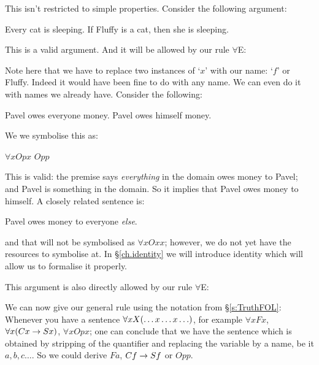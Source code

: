 This isn't restricted to simple properties. Consider the following argument:
\begin{earg}
\prem Every cat is sleeping.
\conc If Fluffy is a cat, then she is sleeping.
\end{earg}
This is a valid argument. And it will be allowed by our rule $\forall$E:
\begin{pf}
	 
\end{pf}
Note here that we have to replace two instances of `$x$' with our name: `$f$' or Fluffy. Indeed it would have been fine to do with any name. We can even do it with names we already have. Consider the following:
\begin{earg}
\prem Pavel owes everyone money.
\conc Pavel owes himself money.
\end{earg}
We we symbolise this as:
\begin{earg}
\prem $\forall x Opx$
\conc $Opp$
\end{earg}
This is valid: the premise says \emph{everything} in the domain owes money to Pavel; and Pavel is something in the domain. So it implies that Pavel owes money to himself. A closely related sentence is: \begin{earg}
\item Pavel owes money to everyone \emph{else}.
\end{earg}and that will not be symbolised as $\forall x Oxx$; however, we do not yet have the resources to symbolise at. In \S\ref{ch.identity} we will introduce identity which will allow us to formalise it properly.

This argument is also directly allowed by our rule $\forall$E:
\begin{pf}
	 
\end{pf}

We can now give our general rule using the notation from \S\ref{s:TruthFOL}: Whenever you have a sentence $\forall xX(\ldots x \ldots x\ldots)$, for example $\forall x Fx$, $\forall x (Cx\rightarrow Sx)$, $\forall x Opx$; one can conclude that we have the sentence which is obtained by stripping of the quantifier and replacing the variable by a name, be it $a,b,c\ldots$. So we could derive $Fa$, $Cf\rightarrow Sf$ or $Opp$.


